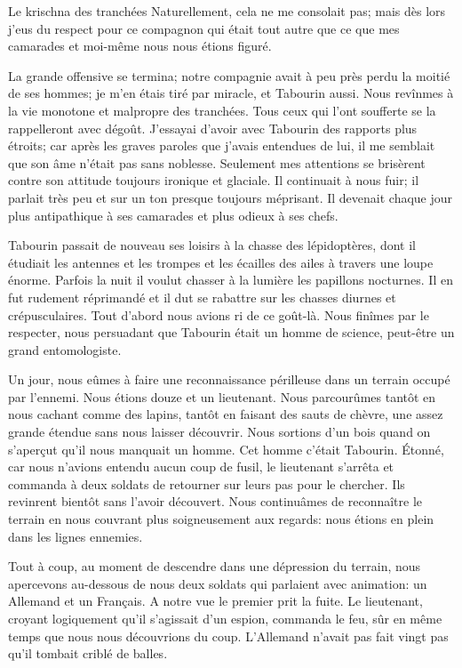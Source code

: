 \begin{chapter}{Le krischna des tranchées}
Naturellement, cela ne me consolait pas; mais dès lors j'eus du respect
pour ce compagnon qui était tout autre que ce que mes camarades et
moi-même nous nous étions figuré.

La grande offensive se termina; notre compagnie avait à peu près perdu
la moitié de ses hommes; je m'en étais tiré par miracle, et Tabourin
aussi. Nous revînmes à la vie monotone et malpropre des tranchées. Tous
ceux qui l'ont soufferte se la rappelleront avec dégoût. J'essayai
d'avoir avec Tabourin des rapports plus étroits; car après les graves
paroles que j'avais entendues de lui, il me semblait que son âme n'était
pas sans noblesse. Seulement mes attentions se brisèrent contre son
attitude toujours ironique et glaciale. Il continuait à nous fuir; il
parlait très peu et sur un ton presque toujours méprisant. Il devenait
chaque jour plus antipathique à ses camarades et plus odieux à ses
chefs.

Tabourin passait de nouveau ses loisirs à la chasse des lépidoptères,
dont il étudiait les antennes et les trompes et les écailles des ailes à
travers une loupe énorme. Parfois la nuit il voulut chasser à la lumière
les papillons nocturnes. Il en fut rudement réprimandé et il dut se
rabattre sur les chasses diurnes et crépusculaires. Tout d'abord nous
avions ri de ce goût-là. Nous finîmes par le respecter, nous persuadant
que Tabourin était un homme de science, peut-être un grand
entomologiste.

Un jour, nous eûmes à faire une reconnaissance périlleuse dans un
terrain occupé par l'ennemi. Nous étions douze et un lieutenant. Nous
parcourûmes tantôt en nous cachant comme des lapins, tantôt en faisant
des sauts de chèvre, une assez grande étendue sans nous laisser
découvrir. Nous sortions d'un bois quand on s'aperçut qu'il nous
manquait un homme. Cet homme c'était Tabourin. Étonné, car nous
n'avions entendu aucun coup de fusil, le lieutenant s'arrêta et commanda
à deux soldats de retourner sur leurs pas pour le chercher. Ils
revinrent bientôt sans l'avoir découvert. Nous continuâmes de
reconnaître le terrain en nous couvrant plus soigneusement aux regards:
nous étions en plein dans les lignes ennemies.

Tout à coup, au moment de descendre dans une dépression du terrain, nous
apercevons au-dessous de nous deux soldats qui parlaient avec animation:
un Allemand et un Français. A notre vue le premier prit la fuite. Le
lieutenant, croyant logiquement qu'il s'agissait d'un espion, commanda
le feu, sûr en même temps que nous nous découvrions du coup. L'Allemand
n'avait pas fait vingt pas qu'il tombait criblé de balles.


\end{chapter}
